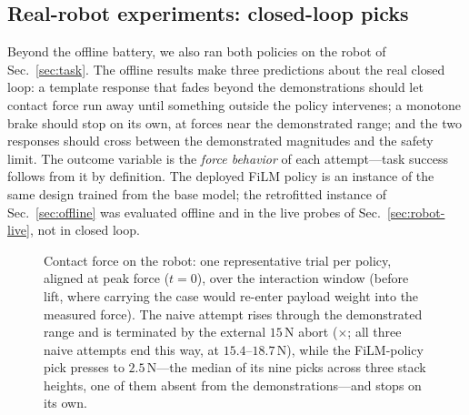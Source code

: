 \subsection{Real-robot experiments: closed-loop picks}
\label{sec:robot}

Beyond the offline battery, we also ran both policies on the robot of Sec.~\ref{sec:task}. The
offline results make three predictions about the real closed loop: a template response that
fades beyond the demonstrations should let contact force run away until something outside the
policy intervenes; a monotone brake should stop on its own, at forces near the demonstrated
range; and the two responses should cross between the demonstrated magnitudes and the safety
limit. The outcome variable is the \emph{force behavior} of each attempt---task success follows
from it by definition. The deployed FiLM policy is an instance of the same design
trained from the base model; the retrofitted instance of Sec.~\ref{sec:offline} was evaluated
offline and in the live probes of Sec.~\ref{sec:robot-live}, not in closed loop.

\begin{figure}[t]
\centering

\caption{Contact force on the robot: one representative trial per policy, aligned at peak
force ($t{=}0$), over the interaction window (before lift, where carrying the case would
re-enter payload weight into the measured force). The naive attempt rises through the
demonstrated range and is terminated by the external $15$\,N abort ($\times$; all three naive
attempts end this way, at $15.4$--$18.7$\,N), while the FiLM-policy pick presses to
$2.5$\,N---the median of its nine picks across three stack heights, one of them absent from
the demonstrations---and stops on its own.}
\label{fig:forcetraces}
\end{figure}

